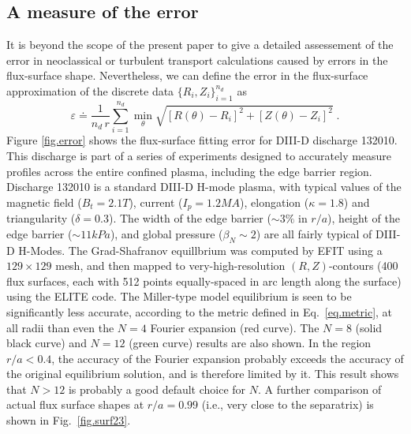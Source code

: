 \subsection{A measure of the error}

It is beyond the scope of the present paper to give 
a detailed assessement of the error in neoclassical or 
turbulent transport calculations caused by errors in 
the flux-surface shape.  Nevertheless, we can define 
the error in the flux-surface approximation of the 
discrete data $\{ R_i,Z_i \}_{i=1}^{n_d}$ as
%
\begin{equation}
\varepsilon \doteq \frac{1}{n_d \, r} \sum_{i=1}^{n_d} 
\min_\theta \sqrt{\left[ R(\theta)-R_i \right]^2 
+\left[ Z(\theta)-Z_i \right]^2} \; .
\label{eq.metric}
\end{equation}
%
Figure \ref{fig.error} shows the flux-surface fitting 
error for DIII-D discharge 132010.  
This discharge is part of a series of experiments
designed to accurately measure profiles across
the entire confined plasma, including the edge
barrier region.  Discharge 132010 is
a standard DIII-D H-mode plasma, with typical values
of the magnetic field ($B_t=2.1T$), current ($I_p=1.2MA$),
elongation ($\kappa = 1.8$) and triangularity ($\delta = 0.3$).
The width of the edge barrier ($\sim3\%$ in $r/a$), height of the
edge barrier ($\sim11 kPa$), and global pressure ($\beta_N \sim 2$)
are all fairly typical of DIII-D H-Modes.
The Grad-Shafranov 
equillbrium was computed by EFIT using a $129 \times 129$ 
mesh, and then mapped to very-high-resolution $(R,Z)$-contours 
(400 flux surfaces, each with 512 points equally-spaced 
in arc length along the surface) using the ELITE code.  
The Miller-type model equilibrium is seen to be significantly 
less accurate, according to the metric defined in Eq.~\ref{eq.metric},
at all radii than even the $N=4$ Fourier expansion (red curve).  
The $N=8$ (solid black curve) and $N=12$ (green curve) results 
are also shown.  In the region $r/a < 0.4$, 
the accuracy of the Fourier expansion probably exceeds the 
accuracy of the original equilibrium solution, and is 
therefore limited by it.  This result shows that $N>12$
is probably a good default choice for $N$.  A further
comparison of actual flux surface shapes at $r/a=0.99$
(i.e., very close to the separatrix) is shown in 
Fig.~\ref{fig.surf23}.
%
